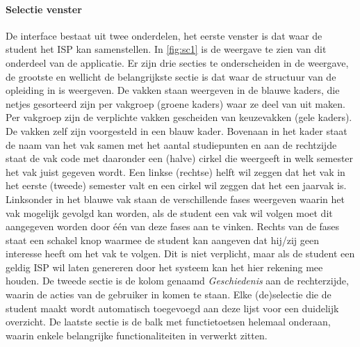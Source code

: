 \paragraph{Selectie venster}
De interface bestaat uit twee onderdelen, het eerste venster is dat waar de student het ISP kan samenstellen. In \ref{fig:sc1} is de weergave te zien van dit onderdeel van de applicatie. Er zijn drie secties te onderscheiden in de weergave, de grootste en wellicht de belangrijkste sectie is dat waar de structuur van de opleiding in is weergeven. De vakken staan weergeven in de blauwe kaders, die netjes gesorteerd zijn per vakgroep (groene kaders) waar ze deel van uit maken. Per vakgroep zijn de verplichte vakken gescheiden van keuzevakken (gele kaders). De vakken zelf zijn voorgesteld in een blauw kader. Bovenaan in het kader staat de naam van het vak samen met het aantal studiepunten en aan de rechtzijde staat de vak code met daaronder een (halve) cirkel die weergeeft in welk semester het vak juist gegeven wordt. Een linkse (rechtse) helft wil zeggen dat het vak in het eerste (tweede) semester valt en een cirkel wil zeggen dat het een jaarvak is. Linksonder in het blauwe vak staan de verschillende fases weergeven waarin het vak mogelijk gevolgd kan worden, als de student een vak wil volgen moet dit aangegeven worden door \'{e}\'{e}n van deze fases aan te vinken. Rechts van de fases staat een schakel knop waarmee de student kan aangeven dat hij/zij geen interesse heeft om het vak te volgen. Dit is niet verplicht, maar als de student een geldig ISP wil laten genereren door het systeem kan het hier rekening mee houden. De tweede sectie is de kolom genaamd \textit{Geschiedenis} aan de rechterzijde, waarin de acties van de gebruiker in komen te staan. Elke (de)selectie die de student maakt wordt automatisch toegevoegd aan deze lijst voor een duidelijk overzicht. De laatste sectie is de balk met functietoetsen helemaal onderaan, waarin enkele belangrijke functionaliteiten in verwerkt zitten. 
